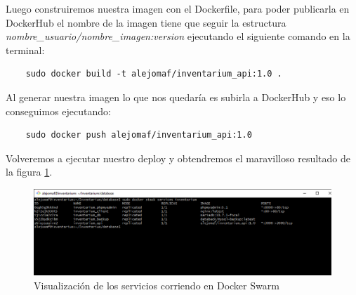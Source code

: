 Luego construiremos nuestra imagen con el Dockerfile, para poder publicarla en DockerHub el nombre de la imagen tiene que seguir la estructura \textit{nombre\_usuario/nombre\_imagen:version} ejecutando el siguiente comando en la terminal:
\begin{verbatim}
    sudo docker build -t alejomaf/inventarium_api:1.0 .
\end{verbatim}
Al generar nuestra imagen lo que nos quedaría es subirla a DockerHub y eso lo conseguimos ejecutando:
\begin{verbatim}
    sudo docker push alejomaf/inventarium_api:1.0
\end{verbatim}
Volveremos a ejecutar nuestro deploy y obtendremos el maravilloso resultado de la figura \ref{fig:docker-swarm-final}.
\begin{figure}
    \centering
    \includegraphics[scale=0.4, keepaspectratio]{imagenes/complemento/docker-swarm/docker-FINAL.png}
    \caption{Visualización de los servicios corriendo en Docker Swarm}\label{fig:docker-swarm-final}
\end{figure}

